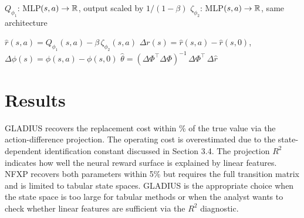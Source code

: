 \documentclass[10pt]{article}
\begin{document}
\begin{algorithm}[H]
\DontPrintSemicolon
\caption{GLADIUS (ERM-IRL) \citep{kang2025}}
\label{alg:gladius}
\BlankLine

$Q_{\phi_1}$: MLP$(s, a) \to \mathbb{R}$, output scaled by $1/(1-\beta)$\;
$\zeta_{\phi_2}$: MLP$(s, a) \to \mathbb{R}$, same architecture\;
\BlankLine

\BlankLine

$\hat r(s,a) = Q_{\phi_1}(s,a) - \beta\,\zeta_{\phi_2}(s,a)$\;
$\Delta r(s) = \hat r(s,a) - \hat r(s,0)$, \quad $\Delta\phi(s) = \phi(s,a) - \phi(s,0)$\;
$\hat\theta = (\Delta\Phi^\top\Delta\Phi)^{-1}\,\Delta\Phi^\top\,\Delta \hat r$ 
\BlankLine

\end{algorithm}


\section{Results}



GLADIUS recovers the replacement cost within \gladRCerr\% of the true value via the action-difference projection. The operating cost is overestimated due to the state-dependent identification constant discussed in Section 3.4. The projection $R^2$ indicates how well the neural reward surface is explained by linear features. NFXP recovers both parameters within 5\% but requires the full transition matrix and is limited to tabular state spaces. GLADIUS is the appropriate choice when the state space is too large for tabular methods or when the analyst wants to check whether linear features are sufficient via the $R^2$ diagnostic.
\end{document}
